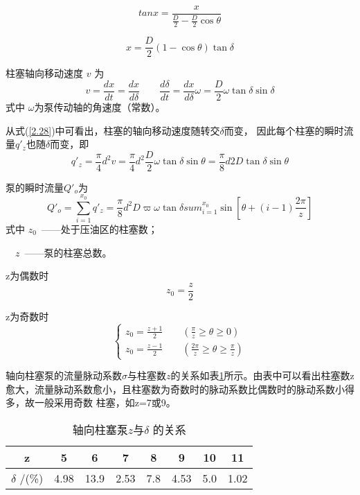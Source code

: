 

\begin{equation*}
    tan x = \frac{x}{\frac{D}{2}-\frac{D}{2}\cos \theta }
\end{equation*}
    
    $$ x = \frac{D}{2}(1-\cos \theta )\tan \delta $$

    柱塞轴向移动速度 $v$ 为
\begin{equation}\label{2.28}
    v = \frac{dx}{dt} = \frac{dx}{d\delta} \qquad\frac{d\delta}{dt}=\frac{dx}{d\delta}\omega=\frac{D}{2}\omega\tan\delta\sin\delta
\end{equation}
    式中 $\omega $为泵传动轴的角速度（常数）。


    从式(\ref{2.28})中可看出，柱塞的轴向移动速度随转交$\delta$而变，
因此每个柱塞的瞬时流量$q'_{z}$也随$\delta$而变，即
  $$q'_{z} =\frac{\pi }{4} d^2v=\frac{\pi }{4}d^2\frac{D}{2}\omega \tan \delta \sin \theta =\frac{\pi }{8}d2D\tan \delta \sin \theta$$
  
   泵的瞬时流量$Q'_{o}$为
\begin{equation}
    Q'_{o}=\sum_{i = 1}^{x_{0}} q'_{z} =\frac{\pi }{8}d^2D\varpi\omega \tan \delta 
    sum_{i = 1}^{x_{0}}\sin [\theta +(i-1)\frac{2\pi }{z}]
\end{equation}
   式中 \qquad$z_{0}$\ ——处于压油区的柱塞数；


\qquad \ \ $z$\ ——泵的柱塞总数。


z为偶数时
$$ z_{0}=\frac{z}{2}$$

z为奇数时
\begin{equation*}
    \begin{cases}
        z_{0}=\frac{z+1}{2}  \qquad    (\frac{\pi }{z}\geq \theta \geq 0) \\
        z_{0}=\frac{z-1}{2}  \qquad    (\frac{2\pi }{z}\geq \theta \geq \frac{\pi }{z})  
    \end{cases}
\end{equation*}

轴向柱塞泵的流量脉动系数$\sigma $与柱塞数$z$的关系如表\ref{tab0201}所示。由表中可以看出柱塞数z
愈大，流量脉动系数愈小，且柱塞数为奇数时的脉动系数比偶数时的脉动系数小得多，故一般采用奇数
柱塞，如z=7或9。

\begin{table}[!htb]\centering
    \caption{轴向柱塞泵$z$与$\delta$ 的关系}
		\label{tab0201}
    \begin{tabular}{@{}cccccccc@{}}
    \toprule
    z      & 5    & 6    & 7    & 8   & 9    & 10  & 11   \\ \midrule
    $\delta$ /(\%) & 4.98 & 13.9 & 2.53 & 7.8 & 4.53 & 5.0 & 1.02 \\ \bottomrule
    \end{tabular}
    \end{table}

